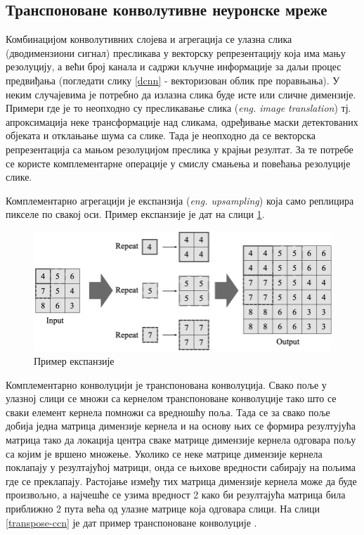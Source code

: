 \documentclass[11pt,oneside]{memoir}
\begin{document}
\subsection{Транспоноване конволутивне неуронске мреже}

Комбинацијом конволутивних слојева и агрегација се улазна слика (дводимензиони сигнал) пресликава у векторску репрезентацију која има мању резолуцију, 
а већи број канала и садржи кључне информације за даљи процес предвиђања (погледати слику \ref{dcnn} - векторизован облик пре поравњања). 
У неким случајевима је потребно да излазна слика буде 
исте или сличне димензије. Примери где је то неопходно су пресликавање слика (\textit{eng. image translation}) тј. апроксимација
неке трансформације над сликама, одређивање маски детектованих објеката и отклањање шума са слике. Тада је неопходно да се
векторска репрезентација са мањом резолуцијом преслика у крајњи резултат. За те потребе се користе комплементарне операције у смислу
смањења и повећања резолуције слике. 

Комплементарно агрегацији је експанзија (\textit{eng. upsampling}) која само реплицира пикселе по свакој оси. 
Пример експанзије је дат на слици \ref{upsampling}. 

\begin{figure}[H]
  \centering
  \includegraphics[width=1.0\textwidth]{images/upsampling.png}
  \caption{Пример експанзије \label{upsampling}}
\end{figure}

Комплементарно конволуцији је транспонована конволуција. Свако поље у улазној слици се множи са кернелом транспоноване конволуције тако што 
се сваки елемент кернела помножи са вредношћу поља. Тада се за свако поље добија једна матрица димензије кернела и на основу њих се формира резултујућа
матрица тако да локација центра сваке матрице димензије кернела одговара пољу са којим је вршено множење. Уколико се неке матрице димензије кернела
поклапају у резултајућој матрици, онда се њихове вредности сабирају на пољима где се преклапају. Растојање између тих матрица димензије кернела
може да буде произвољно, а најчешће се узима вредност 2 како би резултајућа матрица била приближно 2 пута већа од улазне матрице која одговара слици.
На слици \ref{transpose-ccn} је дат пример транспоноване конволуције \cite{dive_into_deep_learning}.
\end{document}
